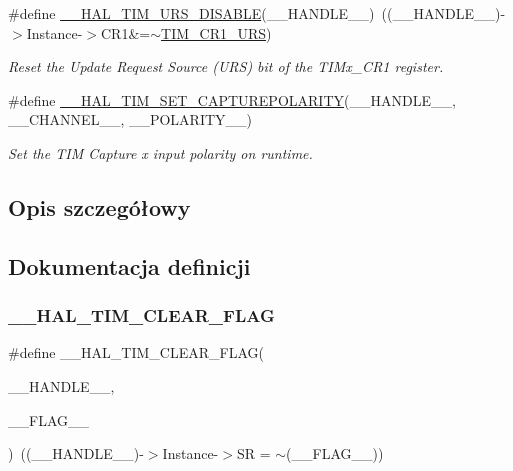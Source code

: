 \begin{DoxyCompactItemize}
\#define \hyperlink{group___t_i_m___exported___macros_gafacb551a4c537e62a0fe740b2f12236c}{\+\_\+\+\_\+\+H\+A\+L\+\_\+\+T\+I\+M\+\_\+\+U\+R\+S\+\_\+\+D\+I\+S\+A\+B\+LE}(\+\_\+\+\_\+\+H\+A\+N\+D\+L\+E\+\_\+\+\_\+)~((\+\_\+\+\_\+\+H\+A\+N\+D\+L\+E\+\_\+\+\_\+)-\/$>$Instance-\/$>$C\+R1\&=$\sim$\hyperlink{group___peripheral___registers___bits___definition_ga06c997c2c23e8bef7ca07579762c113b}{T\+I\+M\+\_\+\+C\+R1\+\_\+\+U\+RS})
\begin{DoxyCompactList}\small\item\em Reset the Update Request Source (U\+RS) bit of the T\+I\+Mx\+\_\+\+C\+R1 register. \end{DoxyCompactList}\item 
\#define \hyperlink{group___t_i_m___exported___macros_gac5d6989516caa67fae23a9329228cdc7}{\+\_\+\+\_\+\+H\+A\+L\+\_\+\+T\+I\+M\+\_\+\+S\+E\+T\+\_\+\+C\+A\+P\+T\+U\+R\+E\+P\+O\+L\+A\+R\+I\+TY}(\+\_\+\+\_\+\+H\+A\+N\+D\+L\+E\+\_\+\+\_\+,  \+\_\+\+\_\+\+C\+H\+A\+N\+N\+E\+L\+\_\+\+\_\+,  \+\_\+\+\_\+\+P\+O\+L\+A\+R\+I\+T\+Y\+\_\+\+\_\+)
\begin{DoxyCompactList}\small\item\em Set the T\+IM Capture x input polarity on runtime. \end{DoxyCompactList}\end{DoxyCompactItemize}


\subsection{Opis szczegółowy}


\subsection{Dokumentacja definicji}
\mbox{\label{group___t_i_m___exported___macros_ga2fe74db6b8cb4badd04ed48e0f5ac7b4}} 
\subsubsection{\texorpdfstring{\+\_\+\+\_\+\+H\+A\+L\+\_\+\+T\+I\+M\+\_\+\+C\+L\+E\+A\+R\+\_\+\+F\+L\+AG}{\_\_HAL\_TIM\_CLEAR\_FLAG}}
{\footnotesize\ttfamily \#define \+\_\+\+\_\+\+H\+A\+L\+\_\+\+T\+I\+M\+\_\+\+C\+L\+E\+A\+R\+\_\+\+F\+L\+AG(\begin{DoxyParamCaption}\item[{}]{\+\_\+\+\_\+\+H\+A\+N\+D\+L\+E\+\_\+\+\_\+,  }\item[{}]{\+\_\+\+\_\+\+F\+L\+A\+G\+\_\+\+\_\+ }\end{DoxyParamCaption})~((\+\_\+\+\_\+\+H\+A\+N\+D\+L\+E\+\_\+\+\_\+)-\/$>$Instance-\/$>$SR = $\sim$(\+\_\+\+\_\+\+F\+L\+A\+G\+\_\+\+\_\+))}



